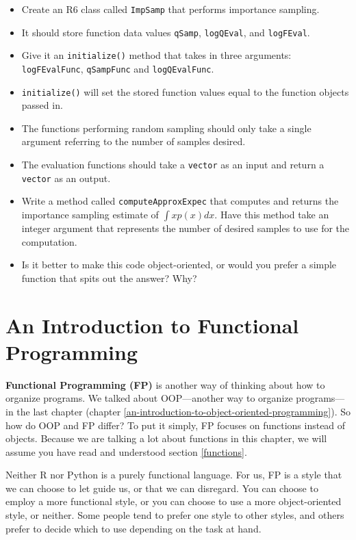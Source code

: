 \documentclass[
  12pt,
  krantz2]{krantz}
\providecommand{\tightlist}{%
  \setlength{\itemsep}{0pt}\setlength{\parskip}{0pt}}
\begin{document}
\begin{itemize}
\tightlist
\item
  Create an R6 class called \texttt{ImpSamp} that performs importance sampling.
\item
  It should store function data values \texttt{qSamp}, \texttt{logQEval}, and \texttt{logFEval}.
\item
  Give it an \texttt{initialize()} method that takes in three arguments: \texttt{logFEvalFunc}, \texttt{qSampFunc} and \texttt{logQEvalFunc}.
\item
  \texttt{initialize()} will set the stored function values equal to the function objects passed in.
\item
  The functions performing random sampling should only take a single argument referring to the number of samples desired.
\item
  The evaluation functions should take a \texttt{vector} as an input and return a \texttt{vector} as an output.
\item
  Write a method called \texttt{computeApproxExpec} that computes and returns the importance sampling estimate of \(\int x p(x) dx\). Have this method take an integer argument that represents the number of desired samples to use for the computation.
\item
  Is it better to make this code object-oriented, or would you prefer a simple function that spits out the answer? Why?
\end{itemize}

\hypertarget{an-introduction-to-functional-programming}{%
\chapter{An Introduction to Functional Programming}\label{an-introduction-to-functional-programming}}

\textbf{Functional Programming (FP)} is another way of thinking about how to organize programs. We talked about OOP---another way to organize programs---in the last chapter (chapter \ref{an-introduction-to-object-oriented-programming}). So how do OOP and FP differ? To put it simply, FP focuses on functions instead of objects. Because we are talking a lot about functions in this chapter, we will assume you have read and understood section \ref{functions}.

Neither R nor Python is a purely functional language. For us, FP is a style that we can choose to let guide us, or that we can disregard. You can choose to employ a more functional style, or you can choose to use a more object-oriented style, or neither. Some people tend to prefer one style to other styles, and others prefer to decide which to use depending on the task at hand.
\end{document}
